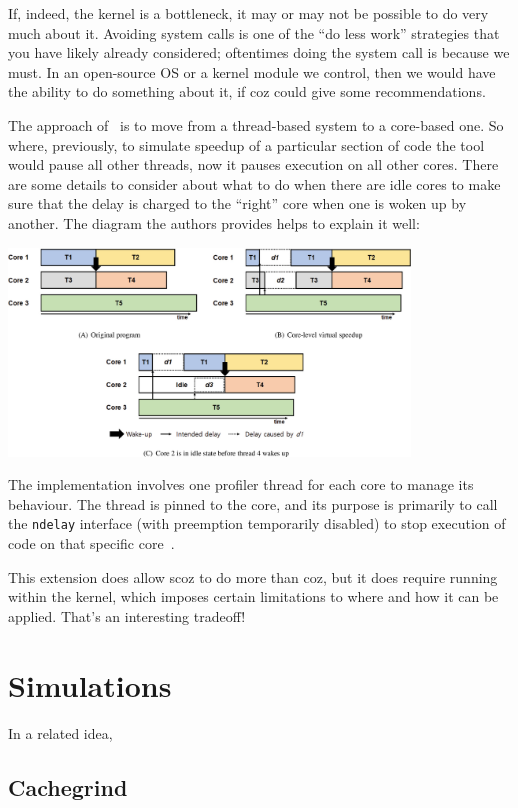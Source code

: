 If, indeed, the kernel is a bottleneck, it may or may not be possible to do very much about it. Avoiding system calls is one of the ``do less work'' strategies that you have likely already considered; oftentimes doing the system call is because we must. In an open-source OS or a kernel module we control, then we would have the ability to do something about it, if coz could give some recommendations.

The approach of~\cite{scoz} is to move from a thread-based system to a core-based one. So where, previously, to simulate speedup of a particular section of code the tool would pause all other threads, now it pauses execution on all other cores. There are some details to consider about what to do when there are idle cores to make sure that the delay is charged to the ``right'' core when one is woken up by another. The diagram the authors provides helps to explain it well:

\begin{center}
	\includegraphics[width=0.8\textwidth]{images/scoz-delay.jpg}
\end{center}

The implementation involves one profiler thread for each core to manage its behaviour. The thread is pinned to the core, and its purpose is primarily to call the \texttt{ndelay} interface (with preemption temporarily disabled) to stop execution of code on that specific core~\cite{scoz}. 

This extension does allow scoz to do more than coz, but it does require running within the kernel, which imposes certain limitations to where and how it can be applied. That's an interesting tradeoff!

\section{Simulations}
In a related idea, 

\subsection*{Cachegrind}

